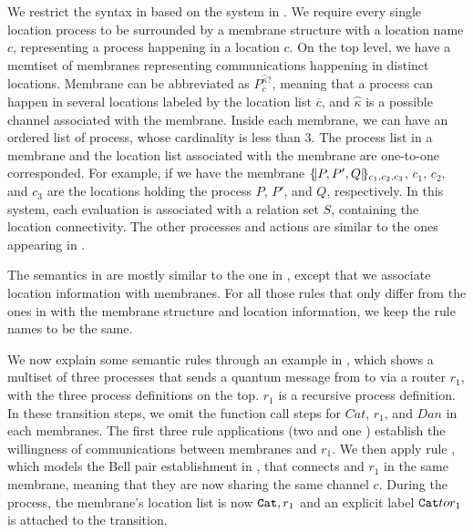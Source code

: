 We restrict the syntax in  based on the system in .
We require every single location process to be surrounded by a membrane structure with a location name $c$, representing a process happening in a location $c$.
On the top level, we have a memtiset of membranes representing communications happening in distinct locations.
Membrane can be abbreviated as $P^{\wideparen{\kappa}?}_{\overline{c}}$, meaning that a process can happen in several locations labeled by the location list $\overline{c}$, and $\wideparen{\kappa}$ is a possible channel associated with the membrane.
Inside each membrane, we can have an ordered list of process, whose cardinality is less than $3$.
The process list in a membrane and the location list associated with the membrane are one-to-one corresponded.
For example, if we have the membrane
$\{\!| P,P',Q |\!\}_{c_1,c_2,c_3}$,
$c_1$, $c_2$, and $c_3$ are the locations holding the process $P$, $P'$, and $Q$, respectively.
In this system, each evaluation is associated with a relation set $S$, containing the location connectivity.
The other processes and actions are similar to the ones appearing in .

The semantics in  are mostly similar to the one in , except that we associate location information with membranes. For all those rules that only differ from the ones in  with the membrane structure and location information, we keep the rule names to be the same.

We now explain some semantic rules through an example in ,
which shows a multiset of three processes that sends a quantum message from  to  via a router $r_1$,
with the three process definitions on the top. $r_1$ is a recursive process definition. In these transition steps, we omit the function call steps for $Cat$, $r_1$, and $Dan$ in each membranes.
The first three rule applications (two  and one ) establish the willingness of communications between membranes  and $r_1$.
We then apply rule , which models the Bell pair establishment in ,
that connects  and $r_1$ in the same membrane, meaning that they are now sharing the same channel $c$.
During the process, the membrane's location list is now $\texttt{Cat},r_1$ and an explicit label $\texttt{Cat} to r_1$ is attached to the transition.

